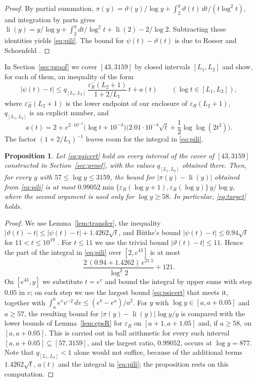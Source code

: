 \documentclass[11pt]{amsart}
\numberwithin{equation}{section}
\newtheorem{proposition}[theorem]{Proposition}
\theoremstyle{definition}
\theoremstyle{remark}
\newcommand{\li}{\operatorname{li}}
\newcommand{\eps}{\varepsilon}
\begin{document}
\begin{proof}
By partial summation, $\pi(y) = \vartheta(y)/\log y + \int_2^y \vartheta(t)\,dt/(t\log^2t)$, and integration by parts gives $\li(y) = y/\log y + \int_2^y dt/\log^2t + \li(2) - 2/\log 2$.
Subtracting these identities yields \eqref{eq:pili}.
The bound for $\psi(t) - \vartheta(t)$ is due to Rosser and Schoenfeld \cite[Theorem~13]{RS62}.
\end{proof}

In Section~\ref{sec:proof} we cover $[43, 3159]$ by closed intervals $[L_1, L_2]$ and show, for each of them, an inequality of the form
\begin{equation}\label{eq:psicert}
|\psi(t) - t| \leq q_{[L_1,L_2]}\,\frac{\eps_R^-(L_2+1)}{1 + 2/L_1}\,t + a(t) \qquad (\log t \in [L_1, L_2]),
\end{equation}
where $\eps_R^-(L_2 + 1)$ is the lower endpoint of our enclosure of $\eps_R(L_2+1)$, $q_{[L_1,L_2]}$ is an explicit number, and
\begin{equation}\label{eq:at}
a(t) = 2 + e^{2\cdot10^{-4}}\big(\log t + 10^{-4}\big)\Big(2.01\cdot10^{-4}\sqrt t + \frac12\log\log(2t^2)\Big).
\end{equation}
The factor $(1 + 2/L_1)^{-1}$ leaves room for the integral in \eqref{eq:pili}.

\begin{proposition}\label{prop:transfer}
Let \eqref{eq:psicert} hold on every interval of the cover of $[43, 3159]$ constructed in Section~\ref{sec:proof}, with the values $q_{[L_1,L_2]}$ obtained there.
Then, for every $y$ with $57 \leq \log y \leq 3159$, the bound for $|\pi(y) - \li(y)|$ obtained from \eqref{eq:pili} is at most $0.99052\min\{\eps_R(\log y + 1), \eps_R(\log y)\}\,y/\log y$, where the second argument is used only for $\log y \geq 58$.
In particular, \eqref{eq:target} holds.
\end{proposition}

\begin{proof}
We use Lemma~\ref{lem:transfer}, the inequality $|\vartheta(t) - t| \leq |\psi(t) - t| + 1.4262\sqrt t$, and B\"uthe's bound $|\psi(t) - t| \leq 0.94\sqrt t$ for $11 < t \leq 10^{19}$ \cite[Theorem~2]{Buthe2018}.
For $t \leq 11$ we use the trivial bound $|\vartheta(t) - t| \leq 11$.
Hence the part of the integral in \eqref{eq:pili} over $[2, e^{43}]$ is at most
\[
\frac{2\,(0.94 + 1.4262)\,e^{21.5}}{\log^2 2} + 121.
\]
On $[e^{43}, y]$ we substitute $t = e^v$ and bound the integral by upper sums with step $0.05$ in $v$; on each step we use the largest bound \eqref{eq:psicert} that meets it, together with $\int_a^b e^v v^{-2}\,dv \leq (e^b - e^a)/a^2$.
For $y$ with $\log y \in [a, a + 0.05]$ and $a \geq 57$, the resulting bound for $|\pi(y) - \li(y)|\log y/y$ is compared with the lower bounds of Lemma~\ref{lem:epsR} for $\eps_R$ on $[a+1, a+1.05]$ and, if $a \geq 58$, on $[a, a+0.05]$.
This is carried out in ball arithmetic for every such interval $[a, a+0.05] \subseteq [57, 3159]$, and the largest ratio, $0.99052$, occurs at $\log y = 877$.
Note that $q_{[L_1,L_2]} < 1$ alone would not suffice, because of the additional terms $1.4262\sqrt t$, $a(t)$ and the integral in \eqref{eq:pili}; the proposition rests on this computation.
\end{proof}
\end{document}
